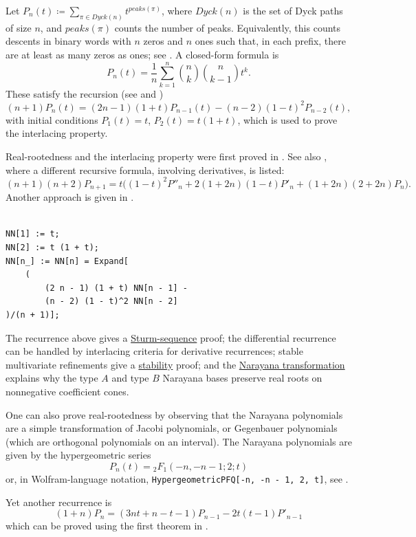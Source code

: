 \begin{example*}\label{ex:narayanaSturm}

Let $P_n(t)\coloneqq \sum_{\pi \in Dyck(n)} t^{peaks(\pi)}$,
where $Dyck(n)$ is the set of Dyck paths of size $n$, and $peaks(\pi)$
counts the number of peaks.  Equivalently, this counts descents in binary
words with $n$ zeros and $n$ ones such that, in each prefix, there are at
least as many zeros as ones; see .
A closed-form formula is
\[
P_n(t) = \frac{1}{n} \sum_{k=1}^n \binom{n}{k} \binom{n}{k-1} t^k.
\]
These satisfy the recursion (see \cite[Eq.~(2)]{Sulanke2002} and
\cite[Eq.~(3.3)]{LiuWang2007})
\[
(n+1) P_n(t) = (2n-1)(1+t)P_{n-1}(t) - (n-2)(1-t)^2 P_{n-2}(t),
\]
with initial conditions $P_1(t)=t$, $P_2(t)=t(1+t)$, which is used to prove
the interlacing property.

Real-rootedness and the interlacing property were first proved in
\cite{Branden2006}.
See also \cite[Eq.~(31)]{Agapito2014}, where a different recursive formula,
involving derivatives, is listed:
\[
 (n+1)(n+2) P_{n+1}
 = t\bigl((1-t)^2 P''_{n} + 2(1+2n)(1-t)P'_{n}
 + (1+2n)(2+2n)P_n\bigr).
\]
Another approach is given in \cite{KostovFinkelshteinShapiro2009}.

\begin{lstlisting}

NN[1] := t;
NN[2] := t (1 + t);
NN[n_] := NN[n] = Expand[
	(
		(2 n - 1) (1 + t) NN[n - 1] -
		(n - 2) (1 - t)^2 NN[n - 2]
)/(n + 1)];
\end{lstlisting}

The recurrence above gives
a \hyperref[sturmSequence]{Sturm-sequence} proof; the differential recurrence
can be handled by interlacing criteria for derivative recurrences; stable
multivariate refinements give a \hyperref[stablePolynomial]{stability}
proof; and the \hyperref[narayanaTransformations]{Narayana transformation}
explains why the type $A$ and type $B$ Narayana bases preserve real roots on
nonnegative coefficient cones.

One can also prove real-rootedness by observing that the Narayana polynomials
are a simple transformation of Jacobi polynomials, or Gegenbauer polynomials
(which are orthogonal polynomials on an interval).
The Narayana polynomials are given by the hypergeometric series
\[
P_n(t) = {}_2F_1(-n, -n-1;2;t)
\]
or, in Wolfram-language notation,
\texttt{HypergeometricPFQ[{-n, -n - 1}, {2}, t]}, see
\cite[Sec.~12]{BarryHennessy2011}.


Yet another recurrence is
\[
(1 + n)P_n=(3nt + n - t - 1) P_{n-1} - 2 t(t-1) P'_{n-1}
\]
which can be proved using the first theorem in \cite{Dung2022x}.


\end{example*}
